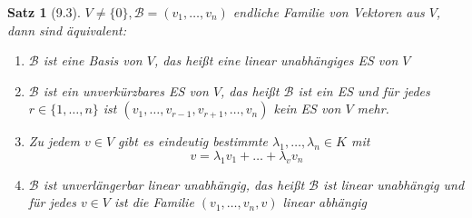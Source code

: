 \documentclass[a4paper]{scrartcl}
\theoremstyle{definition}
\theoremstyle{plain}
\newtheorem{thm}{Satz}
\theoremstyle{plain}
\theoremstyle{remark}
\theoremstyle{remark}
\theoremstyle{remark}
\theoremstyle{remark}
\theoremstyle{remark}
\begin{document}
\begin{thm}[9.3]
$V \neq \{0\}, \mathcal{B} = (v_1, \ldots, v_n)$ endliche Familie von Vektoren aus $V$, dann sind äquivalent:
\begin{enumerate}
\item $\mathcal{B}$ ist eine Basis von $V$, das heißt eine linear unabhängiges ES von $V$
\item $\mathcal{B}$ ist ein unverkürzbares ES von $V$, das heißt $\mathcal{B}$ ist ein ES und für jedes $r\in\{1,\ldots,n\}$ ist $(v_1, \ldots, v_{r - 1}, v_{r + 1}, \ldots, v_n)$ kein ES von $V$ mehr.
\item Zu jedem $v\in V$ gibt es eindeutig bestimmte $\lambda_1, \ldots, \lambda_n \in K$ mit
\[v = \lambda_1 v_1 + \ldots + \lambda_v v_n\]
\item $\mathcal{B}$ ist unverlängerbar linear unabhängig, das heißt $\mathcal{B}$ ist linear unabhängig und für jedes $v\in V$ ist die Familie $(v_1, \ldots, v_n, v)$ linear abhängig
\end{enumerate}
\end{thm}
\end{document}
